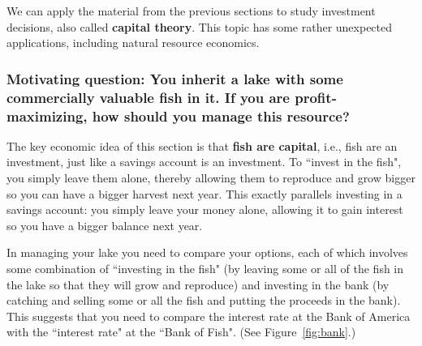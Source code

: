 
We can apply the material from the previous sections to study investment decisions, also called \textbf{capital theory}. This topic has some rather unexpected applications, including natural resource economics.


\subsubsection{Motivating question\rm : You inherit a lake with some commercially valuable fish in it. If you are profit-maximizing, how should you manage this resource?}



The key economic idea of this section is that \textbf{fish are capital}, i.e., fish are an investment, just like a savings account is an investment. To ``invest in the fish", you simply leave them alone, thereby allowing them to reproduce and grow bigger so you can have a bigger harvest next year. This exactly parallels investing in a savings account: you simply leave your money alone, allowing it to gain interest so you have a bigger balance next year.

In managing your lake you need to compare your options, each of which involves some combination of ``investing in the fish" (by leaving some or all of the fish in the lake so that they will grow and reproduce) and investing in the bank (by catching and selling some or all the fish and putting the proceeds in the bank). This suggests that you need to compare the interest rate at the Bank of America with the ``interest rate" at the ``Bank of Fish". (See Figure~\ref{fig:bank}.)

